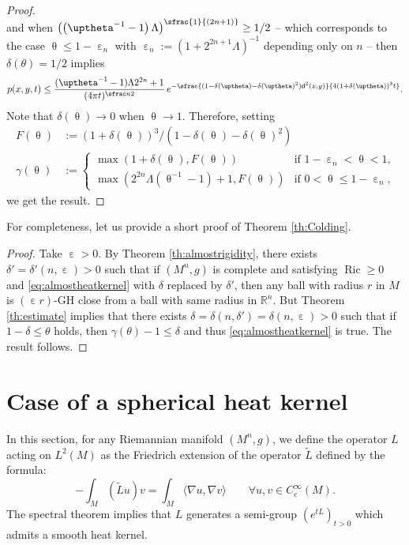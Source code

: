 \documentclass[JEP,XML,SOM,Unicode,published]{cedram}
\newcommand{\spfrac}[2]{\sfrac{#1}{(#2)}}
\newcommand{\rmc}{\mathrm{c}}
\theoremstyle{plain}
\theoremstyle{definition}
\newcommand{\setR}{\mathbb{R}}
\let\eps\upepsilon
\newcommand{\dist}{\mathsf{d}}
\DeclareMathOperator{\Ric}{Ric}
\begin{document}
\begin{proof}
\begin{equation}
\end{equation}
and when $\left(\left(\uptheta^{-1}-1\right)\Lambda\right)^{\spfrac{1}{2n+1}} \ge 1/2$ -- which corresponds to the case $\uptheta \le 1-\eps_n$ with $\eps_n:=(1+2^{2n+1}\Lambda)^{-1}$ depending only on $n$ -- then $\delta(\theta)=1/2$ implies
\begin{equation}\label{eq:end2}
p(x,y,t)\le \frac{(\uptheta^{-1} - 1)\Lambda 2^{2n} + 1}{(4\pi t)^{\sfrac n2}}\,e^{-\sfrac{(1-\delta(\uptheta)-\delta(\uptheta)^2)\dist^2(x,y)}{4(1+\delta(\uptheta))^3t}}.\end{equation}
Note that $\delta(\uptheta) \to 0$ when $\uptheta \to 1$. Therefore, setting
\begin{align*}
F(\uptheta)&:=(1+\delta(\uptheta))^3/(1-\delta(\uptheta)-\delta(\uptheta)^2)\\
\tag*{and}
\gamma(\uptheta)&:=
\begin{cases}
\max(1+\delta(\uptheta),F(\uptheta)) & \text{if $1-\eps_n<\uptheta<1$,}\\
\max(2^{2n}\Lambda (\uptheta^{-1} - 1)+1,F(\uptheta)) & \text{if $0<\uptheta \le 1-\eps_n$,}
\end{cases}
\end{align*}
we get the result.
\end{proof}

For completeness, let us provide a short proof of Theorem \ref{th:Colding}.

\begin{proof}
Take $\upepsilon>0$. By Theorem \ref{th:almostrigidity}, there exists $\delta'=\delta'(n,\upepsilon)>0$ such that if $(M^n,g)$ is complete and satisfying $\Ric \ge 0$ and \eqref{eq:almostheatkernel} with $\delta$ replaced by $\delta'$, then any ball with radius $r$ in $M$ is $(\upepsilon r)$-GH close from a ball with same radius in $\setR^n$. But Theorem \ref{th:estimate} implies that there exists $\delta=\delta(n,\delta')=\delta(n,\upepsilon)>0$ such that if $1-\delta\le \theta$ holds, then $\gamma(\theta)-1 \le \delta$ and thus \eqref{eq:almostheatkernel} is true. The result follows.
\end{proof}

\section{Case of a spherical heat kernel}\label{sec:7}

In this section, for any Riemannian manifold $(M^n,g)$, we define the operator $L$ acting on $L^2(M)$ as the Friedrich extension of the operator $\tilde{L}$ defined by the formula:\vspace*{-3pt}
\[
- \int_M (\tilde{L}u)v = \int_M \langle \nabla u, \nabla v \rangle \qquad \forall u,v \in C^\infty_\rmc(M).
\]
The spectral theorem implies that $L$ generates a semi-group $(e^{tL})_{t>0}$ which admits a smooth heat kernel.
\end{document}
